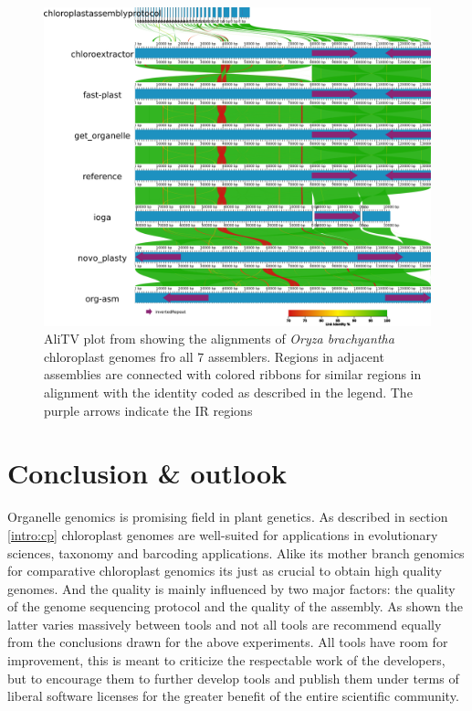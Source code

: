 \begin{figure}[H]
\centering
\includegraphics[height=.60\textheight, width=.99\textwidth]{Figures/AliTV.png}
\decoRule
\caption[AliTV plot of alignments of assemblies of \textit{Oryza brachyantha} of all assemblers]{ AliTV plot
  \cite{alitv} from \cite{freudenthal2019landscape} showing the alignments of \textit{Oryza brachyantha}
  chloroplast genomes fro all 7 assemblers. Regions in adjacent assemblies are connected with colored ribbons
  for similar regions in alignment with the identity coded as described in the legend. The purple arrows
  indicate the IR regions}
\label{fig:alitv}
\end{figure}

\section{Conclusion \& outlook}

Organelle genomics is promising field in plant genetics. As described in section \ref{intro:cp} chloroplast
genomes are well-suited for applications in evolutionary sciences, taxonomy and barcoding applications. Alike
its mother branch genomics for comparative chloroplast genomics its just as crucial to obtain high quality
genomes. And the quality is mainly influenced by two major factors: the quality of the genome sequencing
protocol and the quality of the assembly. As shown the latter varies massively between tools and not all tools
are recommend equally from the conclusions drawn for the above experiments. All tools have room for
improvement, this is meant to criticize the respectable work of the developers, but to encourage them to
further develop tools and publish them under terms of liberal software licenses for the greater benefit of the
entire scientific community.
